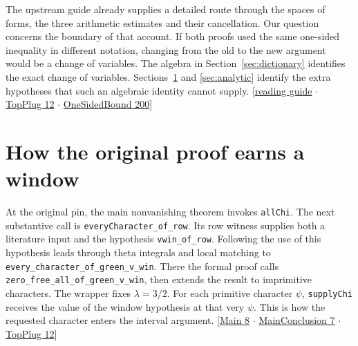 \documentclass[12pt,letterpaper]{article}
\newcommand{\id}[1]{{\small\nolinkurl{#1}}}
\begin{document}
The upstream guide already supplies a detailed route through the spaces of forms, the three arithmetic estimates and their cancellation. Our question concerns the boundary of that account. If both proofs used the same one-sided inequality in different notation, changing from the old to the new argument would be a change of variables. The algebra in Section~\ref{sec:dictionary} identifies the exact change of variables. Sections~\ref{sec:old} and \ref{sec:analytic} identify the extra hypotheses that such an algebraic identity cannot supply. {\small\sffamily\color{mute}[\href{https://github.com/leanprover-community/riemann-hypothesis/blob/e063a923620ee7787b4a1270421478645bf66bdb/GUIDE.md#L1}{reading guide} $\cdot$ \href{https://github.com/nousentllc/riemann-hypothesis/blob/40e56bab026552e089d7afcfeff08d2defb9c005/src/Development/AutomorphicArithmetic/ThetaCorrespondence/ThetaPairLifts/ThirdPlaceSeries/TopPlug.lean#L12}{TopPlug 12} $\cdot$ \href{https://github.com/leanprover-community/riemann-hypothesis/blob/e063a923620ee7787b4a1270421478645bf66bdb/src/New/Reduction/OneSidedBound.lean#L200}{OneSidedBound 200}]}

\section{How the original proof earns a window}\label{sec:old}
At the original pin, the main nonvanishing theorem invokes \id{allChi}. The next substantive call is \id{everyCharacter_of_row}. Its row witness supplies both a literature input and the hypothesis \id{vwin_of_row}. Following the use of this hypothesis leads through theta integrals and local matching to \id{every_character_of_green_v_win}. There the formal proof calls \id{zero_free_all_of_green_v_win}, then extends the result to imprimitive characters. The wrapper fixes $\lambda=3/2$. For each primitive character $\psi$, \id{supplyChi} receives the value of the window hypothesis at that very $\psi$. This is how the requested character enters the interval argument. {\small\sffamily\color{mute}[\href{https://github.com/nousentllc/riemann-hypothesis/blob/40e56bab026552e089d7afcfeff08d2defb9c005/src/Main.lean#L8}{Main 8} $\cdot$ \href{https://github.com/nousentllc/riemann-hypothesis/blob/40e56bab026552e089d7afcfeff08d2defb9c005/src/Development/AutomorphicArithmetic/CharacterBoxes/MainConclusion.lean#L7}{MainConclusion 7} $\cdot$ \href{https://github.com/nousentllc/riemann-hypothesis/blob/40e56bab026552e089d7afcfeff08d2defb9c005/src/Development/AutomorphicArithmetic/ThetaCorrespondence/ThetaPairLifts/ThirdPlaceSeries/TopPlug.lean#L12}{TopPlug 12}]}
\end{document}
